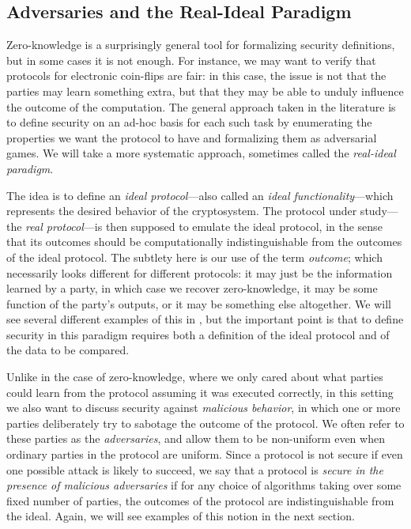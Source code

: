 \subsection{Adversaries and the Real-Ideal Paradigm}
\label{sec:real-ideal}

Zero-knowledge is a surprisingly general tool for formalizing security
definitions, but in some cases it is not enough. For instance, we may want to
verify that protocols for electronic coin-flips are fair: in this case, the
issue is not that the parties may learn something extra, but that they may be
able to unduly influence the outcome of the computation. The general approach
taken in the literature is to define security on an ad-hoc basis for each such
task by enumerating the properties we want the protocol to have and formalizing
them as adversarial games. We will take a more systematic approach, sometimes
called the \emph{real-ideal paradigm}.

The idea is to define an \emph{ideal protocol}---also called an \emph{ideal
functionality}---which represents the desired behavior of the cryptosystem. The
protocol under study---the \emph{real protocol}---is then supposed to emulate the
ideal protocol, in the sense that its outcomes should be computationally
indistinguishable from the outcomes of the ideal protocol. The subtlety here is
our use of the term \emph{outcome}; which necessarily looks different for
different protocols: it may just be the information learned by a party, in which
case we recover zero-knowledge, it may be some function of the party's outputs,
or it may be something else altogether. We will see several different examples
of this in , but the important point is that to define
security in this paradigm requires both a definition of the ideal protocol and
of the data to be compared.

Unlike in the case of zero-knowledge, where we only cared about what parties
could learn from the protocol assuming it was executed correctly, in this
setting we also want to discuss security against \emph{malicious behavior}, in
which one or more parties deliberately try to sabotage the outcome of the
protocol. We often refer to these parties as the \emph{adversaries}, and allow
them to be non-uniform even when ordinary parties in the protocol are uniform.
Since a protocol is not secure if even one possible attack is likely to succeed,
we say that a protocol is \emph{secure in the presence of malicious adversaries}
if for any choice of algorithms taking over some fixed number of parties, the
outcomes of the protocol are indistinguishable from the ideal. Again, we will
see examples of this notion in the next section.

